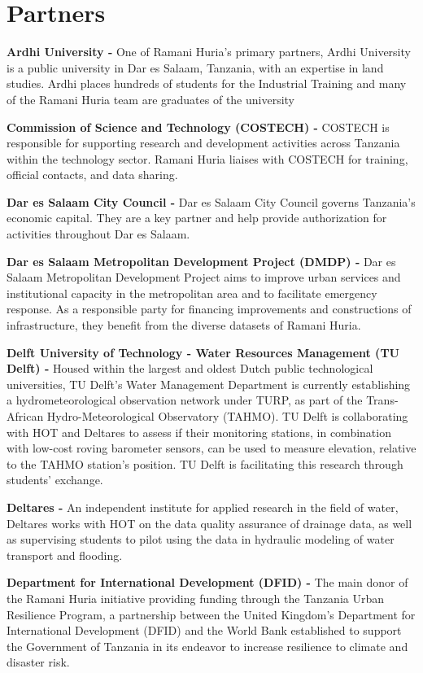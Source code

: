 \documentclass[a4paper,12pt,twoside]{article}
\begin{document}
\section{Partners}
\begin{multicols}
\medskip
\textbf{Ardhi University -} One of Ramani Huria’s primary partners, Ardhi University is a public university in Dar es Salaam, Tanzania, with an expertise in land studies. Ardhi places hundreds of students for the Industrial Training and many of the Ramani Huria team are graduates of the university

\textbf{Commission of Science and Technology (COSTECH) -} COSTECH is responsible for supporting research and development activities across Tanzania within the technology sector. Ramani Huria liaises with COSTECH for training, official contacts, and data sharing.

\textbf{Dar es Salaam City Council -} Dar es Salaam City Council governs Tanzania’s economic capital. They are a key partner and help provide authorization for activities throughout Dar es Salaam. 

\textbf{Dar es Salaam Metropolitan Development Project (DMDP) -} Dar es Salaam Metropolitan Development Project aims to improve urban services and institutional capacity in the metropolitan area and to facilitate emergency response. As a responsible party for financing improvements and constructions of infrastructure, they benefit from the diverse datasets of Ramani Huria. 
\

\textbf{Delft University of Technology - Water Resources Management (TU Delft) -} Housed within the largest and oldest Dutch public technological universities, TU Delft's Water Management Department is currently establishing a hydrometeorological observation network under TURP, as part of the Trans-African Hydro-Meteorological Observatory (TAHMO). TU Delft is collaborating with HOT and Deltares to assess if their monitoring stations, in combination with low-cost roving barometer sensors, can be used to measure elevation, relative to the TAHMO station's position. TU Delft is facilitating this research through students’ exchange. 

\textbf{Deltares -} An independent institute for applied research in the field of water, Deltares works with HOT on the data quality assurance of drainage data, as well as supervising students to pilot using the data in hydraulic modeling of water transport and flooding. 

\textbf{Department for International Development (DFID) -} The main donor of the Ramani Huria initiative providing funding through the Tanzania Urban Resilience Program, a partnership between the United Kingdom’s Department for International Development (DFID) and the World Bank established to support the Government of Tanzania in its endeavor to increase resilience to climate and disaster risk. 


\end{multicols}
\end{document}
